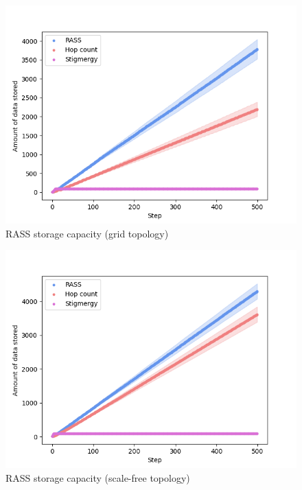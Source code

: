 \begin{figure}
    \includegraphics[width=16cm]{figures/dora_mesh/grid_storage.png}
    \caption{RASS storage capacity (grid topology)}
    \label{results:grid_100_storage}
\end{figure}

\begin{figure}
    \includegraphics[width=16cm]{figures/dora_mesh/scale_storage.png}
        \caption{RASS storage capacity (scale-free topology)}
        \label{results:scale_100_storage}
\end{figure}

